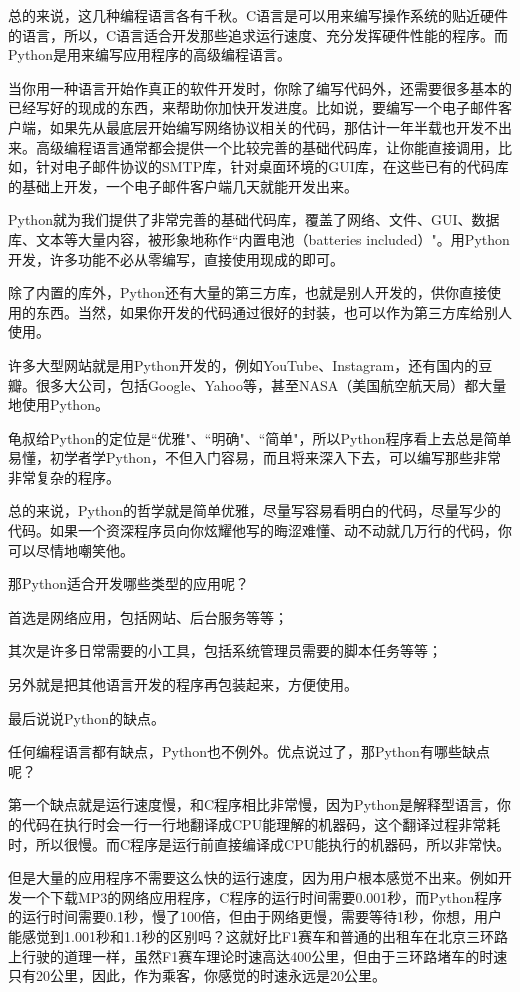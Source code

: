 总的来说，这几种编程语言各有千秋。C语言是可以用来编写操作系统的贴近硬件的语言，所以，C语言适合开发那些追求运行速度、充分发挥硬件性能的程序。而Python是用来编写应用程序的高级编程语言。

当你用一种语言开始作真正的软件开发时，你除了编写代码外，还需要很多基本的已经写好的现成的东西，来帮助你加快开发进度。比如说，要编写一个电子邮件客户端，如果先从最底层开始编写网络协议相关的代码，那估计一年半载也开发不出来。高级编程语言通常都会提供一个比较完善的基础代码库，让你能直接调用，比如，针对电子邮件协议的SMTP库，针对桌面环境的GUI库，在这些已有的代码库的基础上开发，一个电子邮件客户端几天就能开发出来。

Python就为我们提供了非常完善的基础代码库，覆盖了网络、文件、GUI、数据库、文本等大量内容，被形象地称作``内置电池（batteries included）"。用Python开发，许多功能不必从零编写，直接使用现成的即可。

除了内置的库外，Python还有大量的第三方库，也就是别人开发的，供你直接使用的东西。当然，如果你开发的代码通过很好的封装，也可以作为第三方库给别人使用。

许多大型网站就是用Python开发的，例如YouTube、Instagram，还有国内的豆瓣。很多大公司，包括Google、Yahoo等，甚至NASA（美国航空航天局）都大量地使用Python。

龟叔给Python的定位是``优雅"、``明确"、``简单"，所以Python程序看上去总是简单易懂，初学者学Python，不但入门容易，而且将来深入下去，可以编写那些非常非常复杂的程序。

总的来说，Python的哲学就是简单优雅，尽量写容易看明白的代码，尽量写少的代码。如果一个资深程序员向你炫耀他写的晦涩难懂、动不动就几万行的代码，你可以尽情地嘲笑他。

那Python适合开发哪些类型的应用呢？

首选是网络应用，包括网站、后台服务等等；

其次是许多日常需要的小工具，包括系统管理员需要的脚本任务等等；

另外就是把其他语言开发的程序再包装起来，方便使用。

最后说说Python的缺点。

任何编程语言都有缺点，Python也不例外。优点说过了，那Python有哪些缺点呢？

第一个缺点就是运行速度慢，和C程序相比非常慢，因为Python是解释型语言，你的代码在执行时会一行一行地翻译成CPU能理解的机器码，这个翻译过程非常耗时，所以很慢。而C程序是运行前直接编译成CPU能执行的机器码，所以非常快。

但是大量的应用程序不需要这么快的运行速度，因为用户根本感觉不出来。例如开发一个下载MP3的网络应用程序，C程序的运行时间需要0.001秒，而Python程序的运行时间需要0.1秒，慢了100倍，但由于网络更慢，需要等待1秒，你想，用户能感觉到1.001秒和1.1秒的区别吗？这就好比F1赛车和普通的出租车在北京三环路上行驶的道理一样，虽然F1赛车理论时速高达400公里，但由于三环路堵车的时速只有20公里，因此，作为乘客，你感觉的时速永远是20公里。

